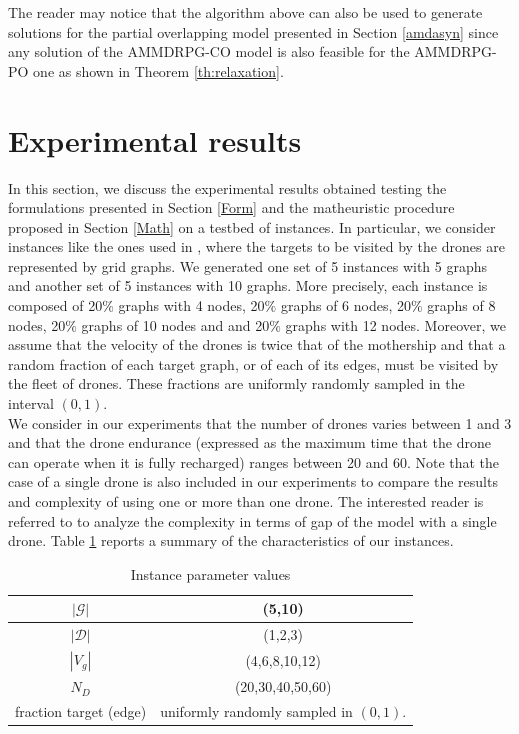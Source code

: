 \documentclass[10pt,a4paper]{elsarticle}
\def\AMDCO{{\sf AMMDRPG-CO\xspace}}
\def\AMDPO{{\sf AMMDRPG-PO\xspace}}
\renewcommand{\arraystretch}{1.5}
\newcommand{\EN}[1]{{\color{black}#1}}
\begin{document}
\bigskip
\noindent
The reader may notice that the \EN{algorithm above} can \EN{also be} used to generate solutions for the partial overlapping model presented in Section \ref{amdasyn} since any solution of the \AMDCO\xspace model is also feasible for the \AMDPO\xspace one as shown in Theorem \ref{th:relaxation}.





\section{Experimental results\label{section:results}}



\noindent
In this section, we discuss the experimental results obtained testing the formulations presented in Section \ref{Form} and the matheuristic procedure proposed in Section \ref{Math} on a testbed of instances. In particular, we consider instances like the ones used in \cite{art:Amorosi2021}, where the targets to be visited by the drones are represented by grid graphs.
We generated one set of 5 instances with 5 graphs and another set of 5 instances with 10 graphs. More precisely, each instance is composed of 20$\%$ graphs with 4 nodes, 20$\%$ graphs of 6 nodes, 20$\%$ graphs of 8 nodes, 20$\%$ graphs of 10 nodes and and 20$\%$ graphs with 12 nodes. Moreover, we assume that the velocity of the drones is twice that of the mothership and that a random fraction of each target graph, or of each of its edges, must be visited by the fleet of drones. These fractions are uniform\EN{ly} randomly sampled in the interval $(0, 1)$.\\

\noindent
We consider in our experiments that the number of drones varies between 1 and 3 and that the drone endurance (expressed as the maximum time that the drone can operate when it is fully recharged) ranges between 20 and 60. Note that the case of a single drone is also included in our experiments to compare the results and complexity of using one \EN{or} more than one drone. The interested reader is referred to \cite{art:Amorosi2021} \EN{to analyze} the complexity in terms of gap of the model with a single drone.
Table \ref{table:tab1} reports a summary of the characteristics of our instances.

\renewcommand{\arraystretch}{0.7}
\begin{table}[!h]
\caption{Instance parameter values}
\centering
\footnotesize
\begin{tabular}{c | c }
	\hline
	$|\mathcal G|$ & (5,10)\\
	\hline
	$|\mathcal D|$ &	(1,2,3)\\
	\hline
	$|V_g|$ & (4,6,8,10,12)\\
	\hline
	$N_D$ & (20,30,40,50,60)\\
	\hline
	fraction target (edge) & uniform\EN{ly} randomly sampled in $(0, 1)$.
\end{tabular}
\label{table:tab1}
\end{table}
\end{document}
